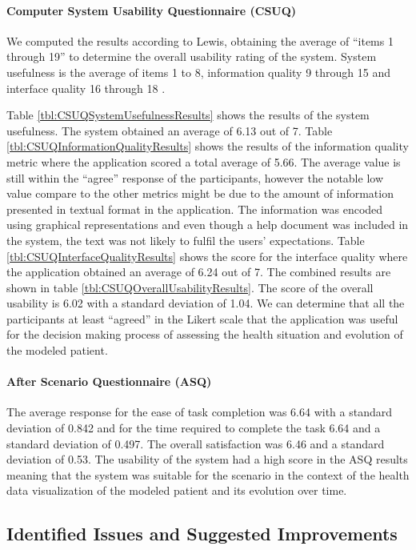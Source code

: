 \documentclass[twocolumn]{bmcart}%
\begin{document}
\paragraph*{Computer System Usability Questionnaire (CSUQ)}
We computed the results according to Lewis, obtaining the average of ``items 1 through 19'' to determine the overall usability rating of the system. System usefulness is the average of items 1 to 8, information quality 9 through 15 and interface quality 16 through 18 \cite{lewis2002psychometric}.

Table \ref{tbl:CSUQSystemUsefulnessResults} shows the results of the system usefulness. The system obtained an average of 6.13 out of 7. Table \ref{tbl:CSUQInformationQualityResults} shows the results of the information quality metric where the application scored a total average of 5.66. The average value is still within the ``agree'' response of the participants, however the notable low value compare to the other metrics might be due to the amount of information presented in textual format in the application. The information was encoded using graphical representations and even though a help document was included in the system, the text was not likely to fulfil the users' expectations. Table \ref{tbl:CSUQInterfaceQualityResults} shows the score for the interface quality where the application obtained an average of 6.24 out of 7. The combined results are shown in table \ref{tbl:CSUQOverallUsabilityResults}. The score of the overall usability is 6.02 with a standard deviation of 1.04. We can determine that all the participants at least ``agreed'' in the Likert scale that the application was useful for the decision making process of assessing the health situation and evolution of the modeled patient.

\paragraph*{After Scenario Questionnaire (ASQ)} The average response for the ease of task completion was 6.64 with a standard deviation of 0.842 and for the time required to complete the task 6.64 and a standard deviation of 0.497. The overall satisfaction was 6.46 and a standard deviation of 0.53. The usability of the system had a high score in the ASQ results meaning that the system was suitable for the scenario in the context of the health data visualization of the modeled patient and its evolution over time.

\subsection*{Identified Issues and Suggested Improvements}
\end{document}
